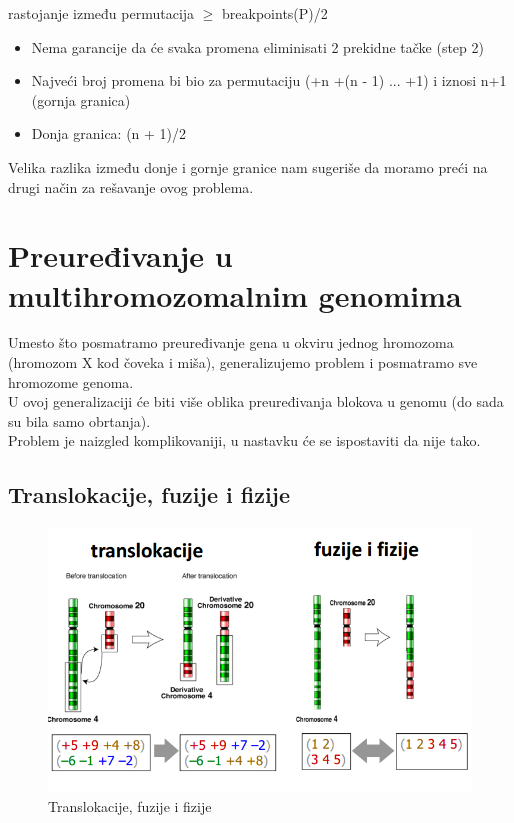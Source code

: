 \hspace{1cm} rastojanje između permutacija $\geq$ breakpoints(P)/2\\

\begin{itemize}
\item{Nema garancije da će svaka promena eliminisati 2 prekidne tačke (step 2)}

\item{Najveći broj promena bi bio za permutaciju (+n +(n - 1) ... +1) i iznosi n+1 (gornja granica)}

\item{Donja granica: (n + 1)/2}
\end{itemize}

\noindent Velika razlika između donje i gornje granice nam sugeriše da moramo preći na drugi način za rešavanje ovog problema.
\newpage
\section{Preuređivanje u multihromozomalnim genomima}

Umesto što posmatramo preuređivanje gena u okviru
jednog hromozoma (hromozom X kod čoveka i miša),
generalizujemo problem i posmatramo sve 
hromozome genoma.\\

U ovoj generalizaciji će biti više oblika
preuređivanja blokova u genomu (do sada su bila
samo obrtanja).\\

Problem je naizgled komplikovaniji, u nastavku će
se ispostaviti da nije tako.\\

\subsection{Translokacije, fuzije i fizije}

\begin{figure}[h!]
\centering
\includegraphics[scale=0.45]{poglavlja/6/slike/preuredjivanja.PNG}
\caption{Translokacije, fuzije i fizije}
\label{slika:X}
\end{figure}

